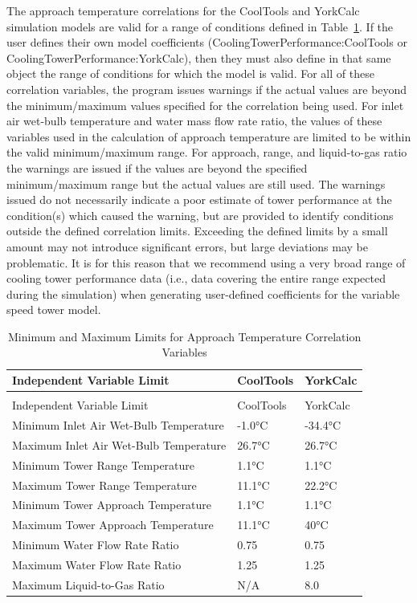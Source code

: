 The approach temperature correlations for the CoolTools and YorkCalc simulation models are valid for a range of conditions defined in Table~\ref{table:minimum-and-maximum-limits-for-approach}. If the user defines their own model coefficients (CoolingTowerPerformance:CoolTools or CoolingTowerPerformance:YorkCalc), then they must also define in that same object the range of conditions for which the model is valid. For all of these correlation variables, the program issues warnings if the actual values are beyond the minimum/maximum values specified for the correlation being used. For inlet air wet-bulb temperature and water mass flow rate ratio, the values of these variables used in the calculation of approach temperature are limited to be within the valid minimum/maximum range. For approach, range, and liquid-to-gas ratio the warnings are issued if the values are beyond the specified minimum/maximum range but the actual values are still used. The warnings issued do not necessarily indicate a poor estimate of tower performance at the condition(s) which caused the warning, but are provided to identify conditions outside the defined correlation limits. Exceeding the defined limits by a small amount may not introduce significant errors, but large deviations may be problematic. It is for this reason that we recommend using a very broad range of cooling tower performance data (i.e., data covering the entire range expected during the simulation) when generating user-defined coefficients for the variable speed tower model.

\begin{longtable}[c]{@{}lll@{}}
\caption{Minimum and Maximum Limits for Approach Temperature Correlation Variables \label{table:minimum-and-maximum-limits-for-approach}} \tabularnewline
\toprule
Independent Variable Limit & CoolTools & YorkCalc \tabularnewline
\midrule
\endfirsthead

\caption[]{Minimum and Maximum Limits for Approach Temperature Correlation Variables} \tabularnewline
\toprule
Independent Variable Limit & CoolTools & YorkCalc \tabularnewline
\midrule
\endhead

Minimum Inlet Air Wet-Bulb Temperature & -1.0°C & -34.4°C \tabularnewline
Maximum Inlet Air Wet-Bulb Temperature & 26.7°C & 26.7°C \tabularnewline
Minimum Tower Range Temperature & 1.1°C & 1.1°C \tabularnewline
Maximum Tower Range Temperature & 11.1°C & 22.2°C \tabularnewline
Minimum Tower Approach Temperature & 1.1°C & 1.1°C \tabularnewline
Maximum Tower Approach Temperature & 11.1°C & 40°C \tabularnewline
Minimum Water Flow Rate Ratio & 0.75 & 0.75 \tabularnewline
Maximum Water Flow Rate Ratio & 1.25 & 1.25 \tabularnewline
Maximum Liquid-to-Gas Ratio & N/A & 8.0 \tabularnewline
\bottomrule
\end{longtable}

